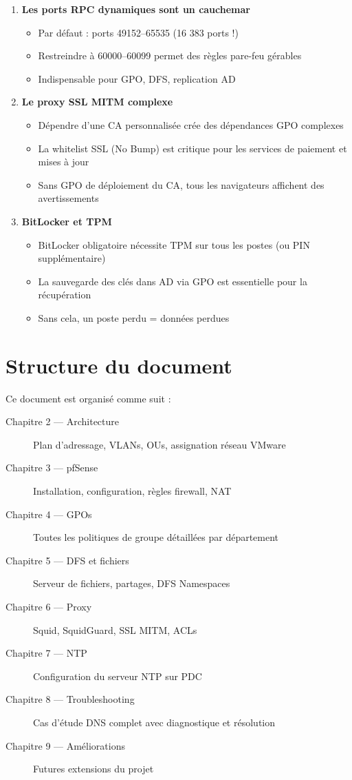 \begin{enumerate}
    \item \textbf{Les ports RPC dynamiques sont un cauchemar}
    \begin{itemize}
        \item Par défaut : ports 49152–65535 (16 383 ports !)
        \item Restreindre à 60000–60099 permet des règles pare-feu gérables
        \item Indispensable pour GPO, DFS, replication AD
    \end{itemize}

    \item \textbf{Le proxy SSL MITM complexe}
    \begin{itemize}
        \item Dépendre d'une CA personnalisée crée des dépendances GPO complexes
        \item La whitelist SSL (No Bump) est critique pour les services de paiement et mises à jour
        \item Sans GPO de déploiement du CA, tous les navigateurs affichent des avertissements
    \end{itemize}

    \item \textbf{BitLocker et TPM}
    \begin{itemize}
        \item BitLocker obligatoire nécessite TPM sur tous les postes (ou PIN supplémentaire)
        \item La sauvegarde des clés dans AD via GPO est essentielle pour la récupération
        \item Sans cela, un poste perdu = données perdues
    \end{itemize}
\end{enumerate}

\section{Structure du document}

Ce document est organisé comme suit :

\begin{description}
    \item[Chapitre 2 — Architecture] Plan d'adressage, VLANs, OUs, assignation réseau VMware
    \item[Chapitre 3 — pfSense] Installation, configuration, règles firewall, NAT
    \item[Chapitre 4 — GPOs] Toutes les politiques de groupe détaillées par département
    \item[Chapitre 5 — DFS et fichiers] Serveur de fichiers, partages, DFS Namespaces
    \item[Chapitre 6 — Proxy] Squid, SquidGuard, SSL MITM, ACLs
    \item[Chapitre 7 — NTP] Configuration du serveur NTP sur PDC
    \item[Chapitre 8 — Troubleshooting] Cas d'étude DNS complet avec diagnostique et résolution
    \item[Chapitre 9 — Améliorations] Futures extensions du projet
\end{description}

